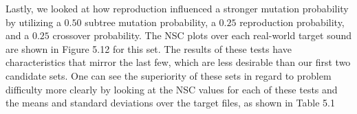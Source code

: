 \documentclass[12pt]{report} 	%
\numberwithin{figure}{chapter}
\numberwithin{table}{chapter}
\numberwithin{equation}{chapter}
\begin{document}
\begin{flushleft}
Lastly, we looked at how reproduction influenced a stronger mutation probability by utilizing a $0.50$ subtree mutation probability, a $0.25$ reproduction probability, and a $0.25$ crossover probability. The NSC plots over each real-world target sound are shown in Figure 5.12 for this set.
The results of these tests have characteristics that mirror the last few, which are less desirable than our first two candidate sets. One can see the superiority of these sets in regard to problem difficulty more clearly by looking at the NSC values for each of these tests and the means and standard deviations over the target files, as shown in Table 5.1

\end{flushleft}
\end{document}
